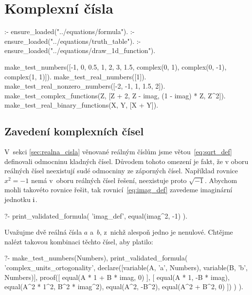 \chapter{Komplexní čísla}


\begin{prolog}
:- ensure_loaded("../equations/formula").
:- ensure_loaded("../equations/truth_table").
:- ensure_loaded("../equations/draw_1d_function").

make_test_numbers([-1, 0, 0.5, 1, 2, 3, 1.5, complex(0, 1), complex(0, -1), complex(1, 1)]).
make_test_real_numbers([1]).
make_test_real_nonzero_numbers([-2, -1, 1, 1.5, 2]).
make_test_complex_functions(Z, [Z + 2, Z - imag, (1 - imag) * Z, Z^2]).
make_test_real_binary_functions(X, Y, [X + Y]).%
\end{prolog}

\section{Zavedení komplexních čísel}

V~sekci \ref{sec:realna_cisla} věnované reálným číslům jsme větou~\eqref{eq:sqrt_def} definovali odmocninu kladných čísel. Důvodem tohoto omezení je fakt, že v oboru reálných čísel neexistují sudé odmocniny ze záporných čísel. Například rovnice \(x^2 = -1\) nemá v~oboru reálných čísel řešení, neexistuje proto \(\sqrt{-1}\). Abychom mohli takovéto rovnice řešit, tak rovnicí~\eqref{eq:imag_def} zavedeme imaginární jednotku \(\mathrm{i}\).

\begin{fact}
\begin{prolog}
?-	print_validated_formula(
		'imag_def',
		equal(imag^2, -1)
	).
\end{prolog}
\end{fact}

Uvažujme dvě reálná čísla \(a\) a~\(b\), z~nichž alespoň jedno je nenulové. Chtějme nalézt takovou kombinaci těchto čísel, aby platilo:

\begin{prolog}
?-	make_test_numbers(Numbers),
	print_validated_formula(
		'complex_units_ortogonality',
		declare([variable(A, 'a', Numbers), variable(B, 'b', Numbers)],
			proof([
				equal(A * 1 + B * imag, 0)
			],
			[
				equal(A * 1, -B * imag),
				equal(A^2 * 1^2, B^2 * imag^2),
				equal(A^2, -B^2),
				equal(A^2 + B^2, 0)
			])
		)
	).
\end{prolog}

